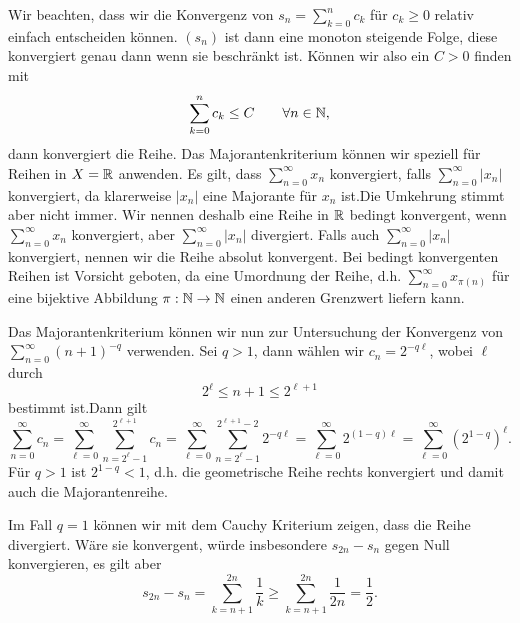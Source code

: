 Wir beachten, dass wir die Konvergenz von \(s_n=\sum_{k=0}^n c_k\) für \(c_k \geq 0\) relativ einfach entscheiden können. \((s_n)\) ist dann eine monoton steigende Folge, diese konvergiert genau dann wenn sie beschränkt ist. Können wir also ein \(C > 0\) finden mit
\begin{equation*}
 \sum_{k=0}^n c_k \leq C \qquad \forall n \in \mathbb{N} ,
\end{equation*}
dann konvergiert die Reihe.
Das Majorantenkriterium können wir speziell für Reihen in \(X=\mathbb{R}\) anwenden. Es gilt, dass \(\sum_{n=0}^\infty x_n\) konvergiert, falls  \(\sum_{n=0}^\infty |x_n|\)  konvergiert, da klarerweise \(|x_n|\) eine Majorante für \(x_n\) ist.Die Umkehrung stimmt aber nicht immer. Wir nennen deshalb eine Reihe in \(\mathbb{R}\) bedingt konvergent, wenn \(\sum_{n=0}^\infty x_n\) konvergiert, aber \(\sum_{n=0}^\infty |x_n|\)  divergiert. Falls auch \(\sum_{n=0}^\infty |x_n|\) konvergiert, nennen wir die Reihe absolut konvergent. Bei bedingt konvergenten Reihen ist Vorsicht geboten, da eine Umordnung der Reihe, d.h. \(\sum_{n=0}^\infty x_{\pi(n)}\) für eine bijektive Abbildung \(\pi: \mathbb{N} \rightarrow \mathbb{N}\) einen anderen Grenzwert liefern kann.
\label{metrik/reihen:example-6}
\begin{example}{}{}



Das Majorantenkriterium können wir nun zur Untersuchung der Konvergenz von \(\sum_{n=0}^\infty (n+1)^{-q}\) verwenden.
Sei \(q > 1\), dann wählen wir \(c_n = 2^{-q \ell}\), wobei \(\ell\) durch
\begin{equation*}
 2^\ell \leq n+1 \leq 2^{\ell+1}
\end{equation*}
bestimmt ist.Dann gilt
\begin{equation*}
 \sum_{n=0}^\infty c_n = \sum_{\ell=0}^\infty \sum_{n=2^\ell-1}^{2^{\ell+1}} c_n = \sum_{\ell=0}^\infty \sum_{n=2^\ell-1}^{2^{\ell+1}-2} 2^{-q\ell} =  \sum_{\ell=0}^\infty  2^{(1-q)\ell} = \sum_{\ell=0}^\infty  (2^{1-q})^\ell.
\end{equation*}
Für \(q > 1\) ist \(2^{1-q} < 1\), d.h. die geometrische Reihe rechts konvergiert und damit auch die Majorantenreihe.

Im Fall \(q=1\) können wir mit dem Cauchy Kriterium zeigen, dass die Reihe divergiert. Wäre sie konvergent, würde insbesondere \(s_{2n} -s_n\) gegen Null konvergieren, es gilt aber
\begin{equation*}
 s_{2n} -s_n = \sum_{k=n+1}^{2n} \frac{1}k \geq \sum_{k=n+1}^{2n} \frac{1}{2n} = \frac{1}2.
\end{equation*}\end{example}

